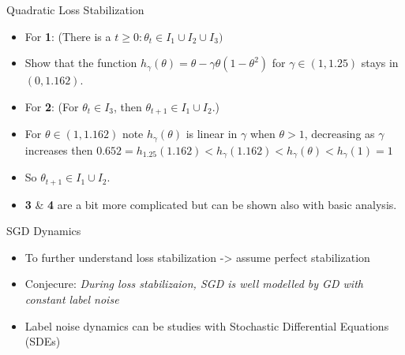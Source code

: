 \documentclass[fleqn]{beamer}
\begin{document}
    \begin{frame}{Quadratic Loss Stabilization}
        \begin{itemize}
            \item For \textbf{1}: (There is a $t\ge 0: \theta_t \in I_1 \cup
                I_2 \cup I_3)$
            \item Show that the function $h_\gamma(\theta) = \theta -
                \gamma\theta(1-\theta^{2})$ for $\gamma \in (1, 1.25)$ stays
                in $(0, 1.162)$.
        \end{itemize}

        \vspace{0.5cm}

        \begin{itemize}
            \item For \textbf{2}: (For $\theta_t \in I_3$, then $\theta_{t+1} \in I_1
                        \cup I_2$.)
            \item For $\theta \in (1, 1.162)$ note $h_\gamma(\theta)$ is linear in $\gamma$ when
                $\theta>1$, decreasing as $\gamma$ increases then \newline
                $0.652 = h_{1.25}(1.162) < h_\gamma(1.162) < h_\gamma(\theta)
                    < h_\gamma(1) = 1$

            \item So $\theta_{t+1} \in I_1 \cup I_2$.

        \end{itemize}

        \vspace{0.5cm}

        \begin{itemize}
            \item \textbf{3} \& \textbf{4} are a bit more complicated but can be
                shown also with basic analysis.
        \end{itemize}
    \end{frame}


    \begin{frame}{SGD Dynamics}
        \begin{itemize}
            \item To further understand loss stabilization -> assume perfect
                stabilization
            \item Conjecure: \textit{During loss stabilizaion, SGD is well
                modelled by GD with constant label noise}

            \item Label noise dynamics can be studies with Stochastic
                Differential Equations (SDEs)
        \end{itemize}

    \end{frame}
\end{document}
